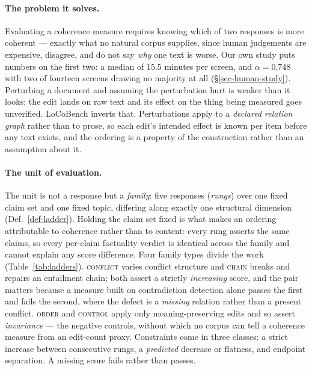 \paragraph{The problem it solves.} Evaluating a coherence measure requires knowing which of two
responses is more coherent --- exactly what no natural corpus supplies, since human judgements are
expensive, disagree, and do not say \emph{why} one text is worse. Our own study puts numbers on the
first two: a median of $15.5$ minutes per screen, and $\alpha=0.748$ with two of fourteen screens
drawing no majority at all (\S\ref{sec-human-study}). Perturbing a document and assuming
the perturbation hurt is weaker than it looks: the edit lands on raw text and its effect on the thing
being measured goes unverified. LoCoBench inverts that. Perturbations apply to a \emph{declared
relation graph} rather than to prose, so each edit's intended effect is known per item before any text
exists, and the ordering is a property of the construction rather than an assumption about it.

\paragraph{The unit of evaluation.} The unit is not a response but a \emph{family}: five responses
(\emph{rungs}) over one fixed claim set and one fixed topic, differing along exactly one structural
dimension (Def.~\ref{def-ladder}). Holding the claim set fixed is what makes an ordering attributable
to coherence rather than to content: every rung asserts the same claims, so every per-claim factuality
verdict is identical across the family and cannot explain any score difference.
Four family types divide the work (Table~\ref{tab:ladders}). \textsc{conflict} varies conflict
structure and \textsc{chain} breaks and repairs an entailment chain; both assert a strictly
\emph{increasing} score, and the pair matters because a measure built on contradiction detection alone
passes the first and fails the second, where the defect is a \emph{missing} relation rather than a
present conflict. \textsc{order} and \textsc{control} apply only meaning-preserving edits and so assert
\emph{invariance} --- the negative controls, without which no corpus can tell a coherence measure from
an edit-count proxy. Constraints come in three classes: a strict increase between consecutive rungs, a
\emph{predicted} decrease or flatness, and endpoint separation. A missing score fails rather than
passes.

